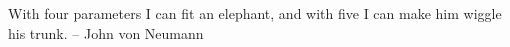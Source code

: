 
\begin{dedication} 

With four parameters I can fit an elephant, \linebreak and with five I can make him wiggle his trunk. \linebreak
\vspace{10mm}
-- John von Neumann

\end{dedication}
